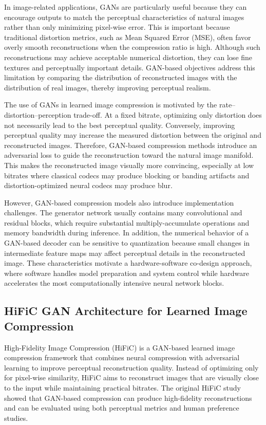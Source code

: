 In image-related applications, GANs are particularly useful because they can encourage outputs to match the perceptual characteristics of natural images rather than only minimizing pixel-wise error. This is important because traditional distortion metrics, such as Mean Squared Error (MSE), often favor overly smooth reconstructions when the compression ratio is high. Although such reconstructions may achieve acceptable numerical distortion, they can lose fine textures and perceptually important details. GAN-based objectives address this limitation by comparing the distribution of reconstructed images with the distribution of real images, thereby improving perceptual realism. \cite{blau2018perception,mentzer2020high}

The use of GANs in learned image compression is motivated by the rate--distortion--perception trade-off. At a fixed bitrate, optimizing only distortion does not necessarily lead to the best perceptual quality. Conversely, improving perceptual quality may increase the measured distortion between the original and reconstructed images. Therefore, GAN-based compression methods introduce an adversarial loss to guide the reconstruction toward the natural image manifold. This makes the reconstructed image visually more convincing, especially at low bitrates where classical codecs may produce blocking or banding artifacts and distortion-optimized neural codecs may produce blur. \cite{blau2018perception,mentzer2020high}

However, GAN-based compression models also introduce implementation challenges. The generator network usually contains many convolutional and residual blocks, which require substantial multiply-accumulate operations and memory bandwidth during inference. In addition, the numerical behavior of a GAN-based decoder can be sensitive to quantization because small changes in intermediate feature maps may affect perceptual details in the reconstructed image. These characteristics motivate a hardware-software co-design approach, where software handles model preparation and system control while hardware accelerates the most computationally intensive neural network blocks. \cite{mentzer2020high,sze2017efficient}

\subsection{HiFiC GAN Architecture for Learned Image Compression}

High-Fidelity Image Compression (HiFiC) is a GAN-based learned image compression framework that combines neural compression with adversarial learning to improve perceptual reconstruction quality. Instead of optimizing only for pixel-wise similarity, HiFiC aims to reconstruct images that are visually close to the input while maintaining practical bitrates. The original HiFiC study showed that GAN-based compression can produce high-fidelity reconstructions and can be evaluated using both perceptual metrics and human preference studies. \cite{mentzer2020high}

